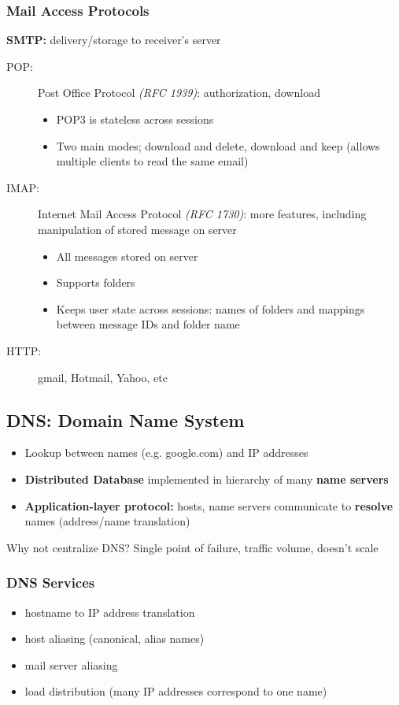 \subsubsection{Mail Access Protocols}
\begin{leftbar}
	\textbf{SMTP:} delivery/storage to receiver's server
\end{leftbar}
\begin{description}
	\item[POP:] Post Office Protocol \textit{(RFC 1939)}: authorization, download
	\begin{itemize}
		\item POP3 is stateless across sessions
		\item Two main modes; download and delete, download and keep (allows multiple clients to read the same email)
	\end{itemize}
	\item[IMAP:] Internet Mail Access Protocol \textit{(RFC 1730)}: more features, including manipulation of stored message on server
	\begin{itemize}
		\item All messages stored on server
		\item Supports folders
		\item Keeps user state across sessions: names of folders and mappings between message IDs and folder name
	\end{itemize}
	\item[HTTP:] gmail, Hotmail, Yahoo, etc
\end{description}

\subsection{DNS: Domain Name System}
\begin{itemize}
	\item Lookup between names (e.g. google.com) and IP addresses
	\item \textbf{Distributed Database} implemented in hierarchy of many \textbf{name servers}
	\item \textbf{Application-layer protocol:} hosts, name servers communicate to \textbf{resolve} names (address/name translation)
\end{itemize}
Why not centralize DNS? Single point of failure, traffic volume, doesn't scale
\subsubsection{DNS Services}
\begin{itemize}
	\item hostname to IP address translation
	\item host aliasing (canonical, alias names)
	\item mail server aliasing
	\item load distribution (many IP addresses correspond to one name)
\end{itemize}
